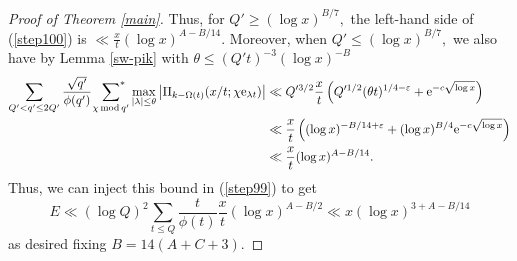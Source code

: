\documentclass[10pt,a4paper]{amsart}
\newcommand{\Mod}{\,\mathrm{mod}\,}
\newcommand{\e}{\mathrm{e}}
\newcommand{\eps}{\varepsilon}
\newcommand{\starsum}{\ \sideset{}{^*}\sum}
\begin{document}
\begin{proof}[Proof of Theorem \ref{main}]
    Thus, for $Q' \ge (\log x)^{B/7},$ the left-hand side of (\ref{step100}) is $\ll \frac{x}{t}(\log x)^{A-B/14}.$ 
    Moreover, when $Q'\le (\log x)^{B/7},$ we also have by Lemma \ref{sw-pik} with $\theta \le (Q't)^{-3}(\log x)^{-B}$
    \begin{align*}
        \sum_{Q' < q'\le 2Q'} \frac{\sqrt{q'}}{\phi(q')} \starsum_{\chi\Mod q'} \max_{|\lambda|\le \theta} \left|\Pi_{k-\Omega(t)}(x/t; \chi\e_{\lambda t})\right| &\ll Q'^{3/2} \frac{x}{t}\left(Q'^{1/2}(\theta t)^{1/4-\eps} + \e^{-c\sqrt{\log x}}\right)
        \\&\ll  \frac{x}{t}\left((\log x)^{-B/14 + \eps} + (\log x)^{B/4}\e^{-c\sqrt{\log x}}\right)
        \\&\ll \frac{x}{t}(\log x)^{A-B/14}.
    \end{align*}
    Thus, we can inject this bound in (\ref{step99}) to get 
    $$E \ll (\log Q)^2 \sum_{t\le Q} \frac{t}{\phi(t)} \frac{x}{t} (\log x)^{A-B/2} \ll x(\log x)^{3+A-B/14}$$ as desired fixing $B = 14(A+C+3).$
\end{proof}
\end{document}
